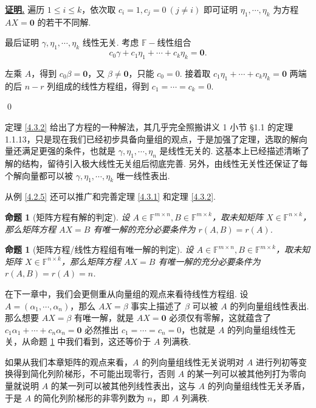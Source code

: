 \documentclass[10pt,openany]{article}
\theoremstyle{thmstyle} %
\theoremstyle{defstyle} %
\theoremstyle{prostyle} %
\newtheorem{proposition}[theorem]{命题}
\theoremstyle{exastyle}
\theoremstyle{remstyle}
\renewenvironment{proof}[1][证明]{\par\underline{\textbf{#1.}} \;\fangsong}{\qed\par}
\newcommand{\F}{\mathbb{F}}
\newcommand{\mn}{^{m \times n}}
\begin{document}
\begin{proof}
	遍历 \( 1 \leq i \leq k \)，依次取 \( c_i=1, c_j=0 \ (j \neq i) \) 即可证明 \( \eta_1,\cdots,\eta_k \) 为方程 \( AX=\bm{0} \) 的若干不同解.
	
	{\color{blue} 最后证明 \( \gamma,\eta_1,\cdots,\eta_k \) 线性无关. 考虑 \( \F-\)线性组合
	\[ c_0\gamma+c_1\eta_1+\cdots+c_k\eta_k=\bm{0}. \]
	
	左乘 \( A \)，得到 \( c_0\beta=\bm{0} \)，又 \( \beta \neq \bm{0} \)，只能 \( c_0=0 \). 接着取 \( c_1\eta_1+\cdots+c_k\eta_k=\bm{0} \) 两端的后 \( n-r \) 列组成的线性方程组，得到 \( c_1=\cdots=c_k=0 \).}
\end{proof}

定理 \ref{4.3.2} 给出了方程的一种解法，其几乎完全照搬讲义 1 小节 \S 1.1 的定理 1.1.13，只是现在我们已经初步具备向量组的观点，于是加强了定理，选取的解向量还满足更强的条件，也就是 \( \gamma,\eta_1,\cdots,\eta_n \) 是线性无关的. 这基本上已经描述清晰了解的结构，留待引入极大线性无关组后彻底完善. 另外，由线性无关性还保证了每个解向量都可以被 \( \gamma,\eta_1,\cdots,\eta_k \) 唯一线性表出.

从例 \ref{4.2.5} 还可以推广和完善定理 \ref{4.3.1} 和定理 \ref{4.3.2}.

\begin{proposition}[矩阵方程有解的判定]
	设 \( A \in \F\mn, B \in \F^{m \times k} \)，取未知矩阵 \( X \in \F^{n \times k} \)，那么矩阵方程 \( AX=B \) 有唯一解的充分必要条件为 \( r(A,B)=r(A) \).
\end{proposition}

\begin{proposition}[矩阵方程/线性方程组有唯一解的判定] \label{4.3.4}
	设 \( A \in \F\mn, B \in \F^{m \times k} \)，取未知矩阵 \( X \in \F^{n \times k} \)，那么矩阵方程 \( AX=B \) 有唯一解的充分必要条件为 \( r(A,B)=r(A)=n \).
\end{proposition}

在下一章中，我们会更侧重从向量组的观点来看待线性方程组. 设 \( A=(\alpha_1,\cdots,\alpha_n) \)，那么 \( AX=\beta \) 事实上描述了 \( \beta \) 可以被 \( A \) 的列向量组线性表出. 那么想要 \( AX=\beta \) 有唯一解，就是 \( AX=\bm{0} \) 必须仅有零解，这就蕴含了 \( c_1\alpha_1+\cdots+c_n\alpha_n=\bm{0} \) 必然推出 \( c_1=\cdots=c_n=0 \)，也就是 \( A \) 的列向量组线性无关，从命题 \ref{4.3.4} 中我们看到，这还等价于 \( A \) 列满秩.

如果从我们本章矩阵的观点来看，\( A \) 的列向量组线性无关说明对 \( A \) 进行列初等变换得到简化列阶梯形，不可能出现零行，否则 \( A \) 的某一列可以被其他列打为零向量就说明 \( A \) 的某一列可以被其他列线性表出，这与 \( A \) 的列向量组线性无关矛盾，于是 \( A \) 的简化列阶梯形的非零列数为 \( n \)，即 \( A \) 列满秩.
\end{document}
